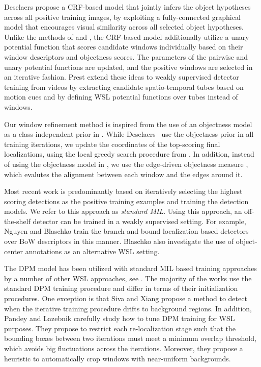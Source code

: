\documentclass[10pt,journal,cspaper,final,twocolumn,compsoc]{./IEEEtran}
\begin{document}
Deselaers \etal\cite{deselaers12ijcv} propose a CRF-based
model that jointly infers the object hypotheses across all
positive training images, by exploiting a fully-connected
graphical model that encourages visual similarity across
all selected object hypotheses.  Unlike the methods of
\cite{kim09nips} and \cite{chum07cvpr}, the CRF-based
model additionally utilize a  unary potential
function that scores candidate windows individually based on their 
window descriptors and objectness scores. The
parameters of the pairwise and unary potential functions
are updated, and the positive windows are selected in an
iterative fashion. Prest \etal\cite{prest12cvpr} extend
these ideas to weakly supervised detector training from
videos by extracting candidate spatio-temporal tubes based
on motion cues and by defining WSL potential functions
over tubes instead of windows.

Our window refinement method is inspired from the use of
an objectness model as a class-independent prior in
\cite{deselaers12ijcv}. While Deselaers~\etal\cite{deselaers12ijcv} use the objectness prior in all training iterations,
we update the coordinates of
the top-scoring final localizations, 
using the local greedy search procedure from
\cite{zitnick14eccv}.  In addition, instead of using the
objectness model in \cite{alexe12pami}, we use the
edge-driven objectness measure \cite{zitnick14eccv},
which evalutes the alignment between each window and 
the edges around it. 

Most recent work is predominantly based on iteratively 
selecting the highest scoring detections as the positive
training examples and training the detection models. 
We refer to this approach as {\em standard MIL}. 
Using this approach, an off-the-shelf detector can be trained
in a weakly supervised setting.
For example, Nguyen \etal\cite{nguyen09iccv} and
Blaschko \etal\cite{blaschko10nips} train the branch-and-bound
localization \cite{lampert09pami} based detectors over
BoW descriptors  in this manner. 
Blaschko \etal  also investigate 
the use of object-center annotations as an alternative WSL setting.

The DPM model \cite{felzenszalb10pami} has been utilized
with standard MIL based training approaches by a number of other WSL approaches, see \eg\cite{siva11iccv,siva12eccv,shi13iccv,siva13cvpr,pandey11iccv}.
The majority of the works use the standard DPM training
procedure and differ in terms of their initialization
procedures. One exception is that Siva and Xiang \cite{siva11iccv}
propose a method to detect when the iterative training
procedure drifts to background regions. In addition,
Pandey and Lazebnik \cite{pandey11iccv} carefully study how to tune DPM
training for WSL purposes. They propose
to restrict each re-localization stage such that the
bounding boxes between two iterations must meet a minimum
overlap threshold, which avoids big fluctuations across
the iterations. Moreover, they propose a heuristic to
automatically crop windows with near-uniform backgrounds.
\end{document}
